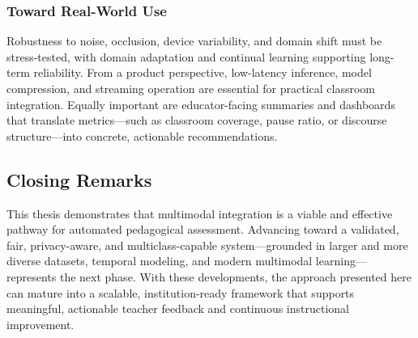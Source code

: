 \subsubsection{Toward Real-World Use}
Robustness to noise, occlusion, device variability, and domain shift must be stress-tested, with domain adaptation and continual learning supporting long-term reliability. From a product perspective, low-latency inference, model compression, and streaming operation are essential for practical classroom integration. Equally important are educator-facing summaries and dashboards that translate metrics—such as classroom coverage, pause ratio, or discourse structure—into concrete, actionable recommendations.

\subsection{Closing Remarks}
This thesis demonstrates that multimodal integration is a viable and effective pathway for automated pedagogical assessment. Advancing toward a validated, fair, privacy-aware, and multiclass-capable system—grounded in larger and more diverse datasets, temporal modeling, and modern multimodal learning—represents the next phase. With these developments, the approach presented here can mature into a scalable, institution-ready framework that supports meaningful, actionable teacher feedback and continuous instructional improvement.

